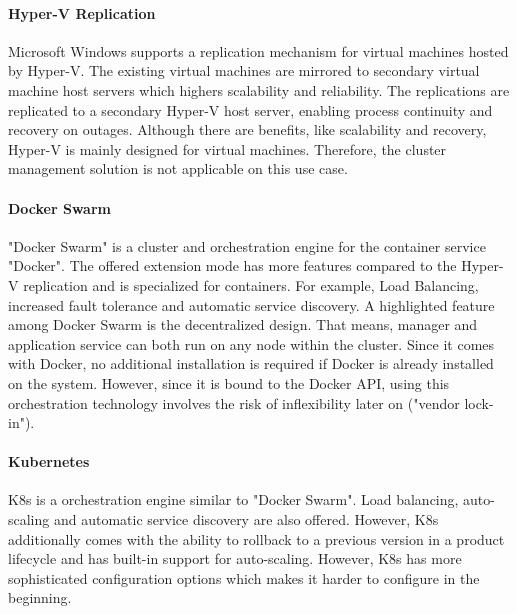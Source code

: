 \paragraph{Hyper-V Replication}
Microsoft Windows supports a replication mechanism for virtual machines hosted by Hyper-V. The existing virtual machines are mirrored to secondary virtual machine host servers which highers scalability and reliability. The replications are replicated to a secondary Hyper-V host server, enabling process continuity and recovery on outages.
Although there are benefits, like scalability and recovery, Hyper-V is mainly designed for virtual machines. Therefore, the cluster management solution is not applicable on this use case.

\paragraph{Docker Swarm}
"Docker Swarm" is a cluster and orchestration engine for the container service "Docker". The offered extension mode has more features compared to the Hyper-V replication and is specialized for containers. For example, Load Balancing, increased fault tolerance and automatic service discovery.
A highlighted feature among Docker Swarm is the decentralized design. That means, manager and application service can both run on any node within the cluster. Since it comes with Docker, no additional installation is required if Docker is already installed on the system.
However, since it is bound to the Docker API, using this orchestration technology involves the risk of inflexibility later on ("vendor lock-in").

 
\paragraph{Kubernetes}
\acf{K8s} is a orchestration engine similar to "Docker Swarm". Load balancing, auto-scaling and automatic service discovery are also offered. However, \ac{K8s} additionally comes with the ability to rollback to a previous version in a product lifecycle and has built-in support for auto-scaling.
However, \ac{K8s} has more sophisticated configuration options which makes it harder to configure in the beginning.

